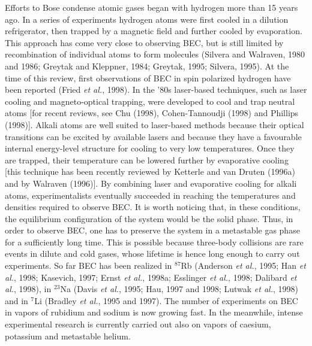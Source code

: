 Efforts to Bose condense atomic gases began with hydrogen more than 15 
years ago.  In a series of experiments hydrogen atoms were first cooled 
in a dilution refrigerator, then trapped by a magnetic field and further 
cooled by evaporation. This approach has come very close to observing BEC, 
but is still limited by recombination of individual atoms to form molecules
(Silvera and Walraven, 1980 and 1986; Greytak and Kleppner, 1984; 
Greytak, 1995; Silvera, 1995). At the time of this review, first 
observations of BEC in spin polarized hydrogen have been reported
(Fried {\it et al.}, 1998). In the '80s laser-based techniques,
such as laser cooling and magneto-optical trapping, were developed
to cool and trap neutral atoms [for recent reviews, see Chu (1998), 
Cohen-Tannoudji (1998) and Phillips (1998)].  Alkali atoms are well 
suited to laser-based methods because their optical transitions can be 
excited by available lasers and because they have a favourable internal 
energy-level structure for cooling to very low temperatures. Once they are 
trapped, their temperature can be lowered further by evaporative cooling 
[this technique has been recently reviewed by Ketterle and van 
Druten (1996a) and by Walraven (1996)].  By combining laser and 
evaporative cooling for alkali atoms, experimentalists 
eventually succeeded in reaching the temperatures and densities required to 
observe BEC. It is worth noticing that, in these conditions, the equilibrium 
configuration of the system  would be the solid phase. Thus, in order to 
observe BEC, one has to preserve the system in a metastable gas phase 
for a sufficiently long time. This is possible because three-body 
collisions are rare events in dilute and cold gases, whose lifetime 
is hence long enough to carry out experiments. So far BEC has 
been realized in $^{87}$Rb (Anderson {\it et al.}, 1995; Han {\it et al.}, 
1998; Kasevich, 1997; Ernst {\it et al.}, 1998a; Esslinger {\it et al.}, 
1998; Dalibard {\it et al.}, 1998), in $^{23}$Na (Davis {\it et al.}, 
1995; Hau, 1997 and 1998;  Lutwak {\it et al.}, 1998) and in $^7$Li 
(Bradley {\it et al.}, 1995 and 1997). The number of experiments on BEC 
in vapors of rubidium and sodium is now growing fast. In the
meanwhile, intense experimental research is currently carried out also 
on vapors of caesium, potassium and metastable helium.   

